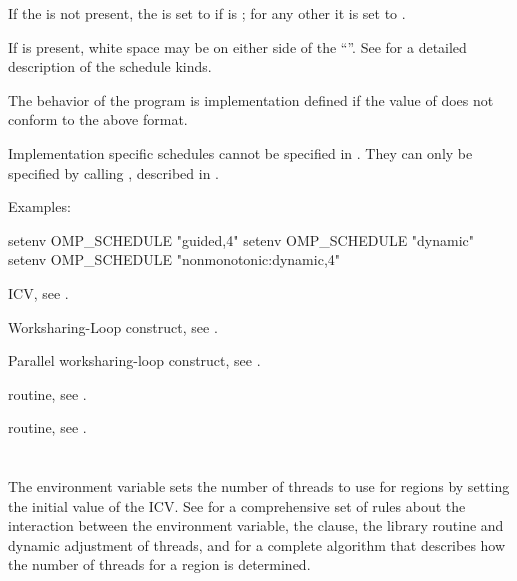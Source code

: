 If the  is not present, the  is set to 
 if  is ; for any other  
it is set to .

If  is present, white space may be on either side of the 
``\code{,}''. See  for a detailed 
description of the schedule kinds.

The behavior of the program is implementation defined if the value of 
 does not conform to the above format.

Implementation specific schedules cannot be specified in . 
They can only be specified by calling , described in 
.

Examples:

\begin{ompEnv}
setenv OMP_SCHEDULE "guided,4"
setenv OMP_SCHEDULE "dynamic"
setenv OMP_SCHEDULE "nonmonotonic:dynamic,4"
\end{ompEnv}

\begin{crossrefs}
\item {} ICV, see .

\item Worksharing-Loop construct, see .

\item Parallel worksharing-loop construct, 
see .

\item {} routine, see .

\item {} routine, see .
\end{crossrefs}



\section{}
\label{sec:OMP_NUM_THREADS}
The  environment variable sets the number of threads 
to use for  regions by setting the initial value of the 
 ICV. See  for 
a comprehensive set of rules about the interaction between the
 environment variable, the  clause, the
 library routine and dynamic adjustment of threads, and
for a complete algorithm that describes how the number of
threads for a  region is determined.

